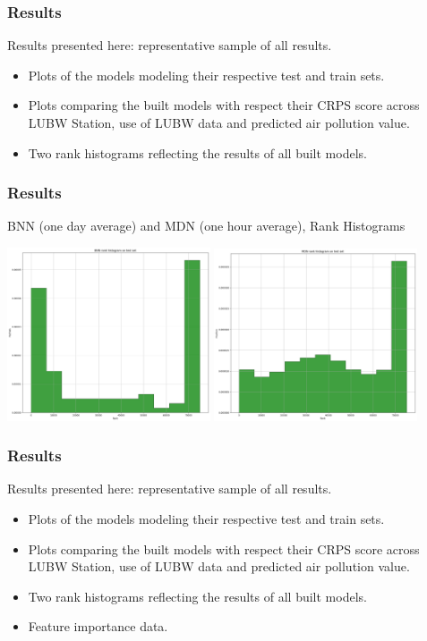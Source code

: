 \documentclass[18pt]{beamer}
\begin{document}
\begin{frame}[t]
  \frametitle{Results}
  Results presented here: representative sample of all results.
  \begin{itemize}
  \item Plots of the models modeling their respective test and train sets.
  \item Plots comparing the built models with respect their CRPS score across LUBW Station, use of LUBW data and predicted air pollution value.
    \pause
  \item Two rank histograms reflecting the results of all built models.
  \end{itemize}
\end{frame}

\begin{frame}[t]
  \frametitle{Results}
  BNN (one day average) and MDN (one hour average), Rank Histograms  
  \begin{center}
    \includegraphics[height=0.45\textwidth, width=0.45\textwidth ]{images/ver/bnn-rank-1d}
    \includegraphics[height=0.45\textwidth, width=0.45\textwidth ]{images/ver/mdn-rank-1h}
  \end{center}  
\end{frame}


\begin{frame}[t]
  \frametitle{Results}
  Results presented here: representative sample of all results.
  \begin{itemize}
  \item Plots of the models modeling their respective test and train sets.
  \item Plots comparing the built models with respect their CRPS score across LUBW Station, use of LUBW data and predicted air pollution value.
  \item Two rank histograms reflecting the results of all built models.
    \pause
  \item Feature importance data.
  \end{itemize}
\end{frame}
\end{document}
